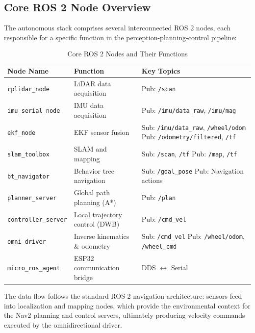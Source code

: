\subsection{Core ROS 2 Node Overview}

The autonomous stack comprises several interconnected ROS 2 nodes, each responsible for a specific function in the perception-planning-control pipeline:

\begin{table}[H]
\centering
\caption{Core ROS 2 Nodes and Their Functions}
\label{tab:ros_nodes}
\begin{tabular}{|l|p{4.5cm}|p{5cm}|}
\hline
\textbf{Node Name} & \textbf{Function} & \textbf{Key Topics} \\
\hline
\texttt{rplidar\_node} & LiDAR data acquisition & Pub: \texttt{/scan} \\
\texttt{imu\_serial\_node} & IMU data acquisition & Pub: \texttt{/imu/data\_raw}, \texttt{/imu/mag} \\
\texttt{ekf\_node} & EKF sensor fusion & Sub: \texttt{/imu/data\_raw}, \texttt{/wheel/odom} \newline Pub: \texttt{/odometry/filtered}, \texttt{/tf} \\
\texttt{slam\_toolbox} & SLAM and mapping & Sub: \texttt{/scan}, \texttt{/tf} \newline Pub: \texttt{/map}, \texttt{/tf} \\
\texttt{bt\_navigator} & Behavior tree navigation & Sub: \texttt{/goal\_pose} \newline Pub: Navigation actions \\
\texttt{planner\_server} & Global path planning (A*) & Pub: \texttt{/plan} \\
\texttt{controller\_server} & Local trajectory control (DWB) & Pub: \texttt{/cmd\_vel} \\
\texttt{omni\_driver} & Inverse kinematics \& odometry & Sub: \texttt{/cmd\_vel} \newline Pub: \texttt{/wheel/odom}, \texttt{/wheel\_cmd} \\
\texttt{micro\_ros\_agent} & ESP32 communication bridge & DDS $\leftrightarrow$ Serial \\
\hline
\end{tabular}
\end{table}

The data flow follows the standard ROS 2 navigation architecture: sensors feed into localization and mapping nodes, which provide the environmental context for the Nav2 planning and control servers, ultimately producing velocity commands executed by the omnidirectional driver.

